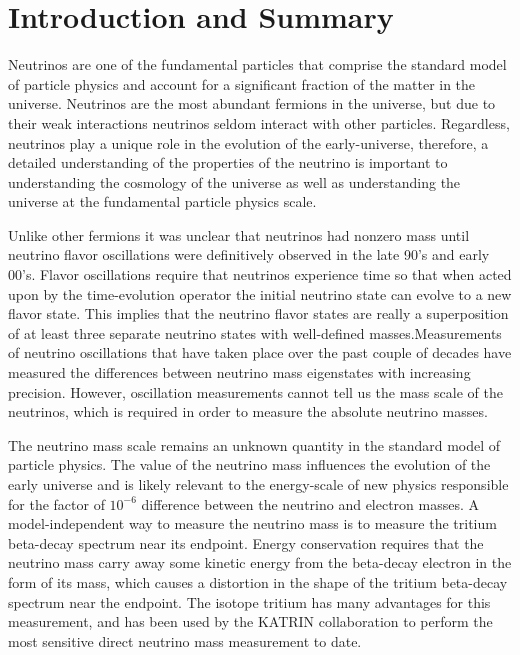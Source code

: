 
\chapter{Introduction and Summary} 
\label{chap:introduction}

Neutrinos are one of the fundamental particles that comprise the standard model of particle physics and account for a significant fraction of the matter in the universe. Neutrinos are the most abundant fermions in the universe, but due to their weak interactions neutrinos seldom interact with other particles. Regardless, neutrinos play a unique role in the evolution of the early-universe, therefore, a detailed understanding of the properties of the neutrino is important to understanding the cosmology of the universe as well as understanding the universe at the fundamental particle physics scale.

Unlike other fermions it was unclear that neutrinos had nonzero mass until neutrino flavor oscillations were definitively observed in the late 90's and early 00's. Flavor oscillations require that neutrinos experience time so that when acted upon by the time-evolution operator the initial neutrino state can evolve to a new flavor state. This implies that the neutrino flavor states are really a superposition of at least three separate neutrino states with well-defined masses.Measurements of neutrino oscillations that have taken place over the past couple of decades have measured the differences between neutrino mass eigenstates with increasing precision. However, oscillation measurements cannot tell us the mass scale of the neutrinos, which is required in order to measure the absolute neutrino masses.

The neutrino mass scale remains an unknown quantity in the standard model of particle physics. The value of the neutrino mass influences the evolution of the early universe and is likely relevant to the energy-scale of new physics responsible for the factor of $10^{-6}$ difference between the neutrino and electron masses. A model-independent way to measure the neutrino mass is to measure the tritium beta-decay spectrum near its endpoint. Energy conservation requires that the neutrino mass carry away some kinetic energy from the beta-decay electron in the form of its mass, which causes a distortion in the shape of the tritium beta-decay spectrum near the endpoint. The isotope tritium has many advantages for this measurement, and has been used by the KATRIN collaboration to perform the most sensitive direct neutrino mass measurement to date.

